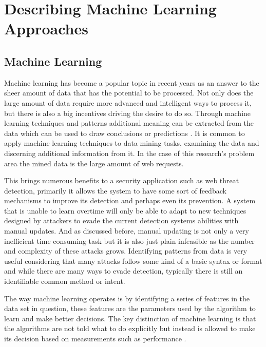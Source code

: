 \chapter{Describing Machine Learning Approaches} \label{sec:sectionFour}

\section{Machine Learning} \label{sec:machineLearning}

Machine learning has become a popular topic in recent years as an answer to the sheer amount of data that has the potential to be processed.  Not only does the large amount of data require more advanced and intelligent ways to process it, but there is also a big incentives driving the desire to do so.  Through machine learning techniques and patterns additional meaning can be extracted from the data which can be used to draw conclusions or predictions \cite{dataManagementSystems}.  It is common to apply machine learning techniques to data mining tasks, examining the data and discerning additional information from it.  In the case of this research's problem area the mined data is the large amount of web requests.

This brings numerous benefits to a security application such as web threat detection, primarily it allows the system to have some sort of feedback mechanisms to improve its detection and perhaps even its prevention.  A system that is unable to learn overtime will only be able to adapt to new techniques designed by attackers to evade the current detection systems abilities with manual updates.  And as discussed before, manual updating is not only a very inefficient time consuming task but it is also just plain infeasible as the number and complexity of these attacks grows.  Identifying patterns from data is very useful considering that many attacks follow some kind of a basic syntax or format and while there are many ways to evade detection, typically there is still an identifiable common method or intent.

The way machine learning operates is by identifying a series of features in the data set in question, these features are the parameters used by the algorithm to learn and make better decisions.  The key distinction of machine learning is that the algorithms are not told what to do explicitly but instead is allowed to make its decision based on measurements such as performance \cite{supervisedMachineLearning}.

